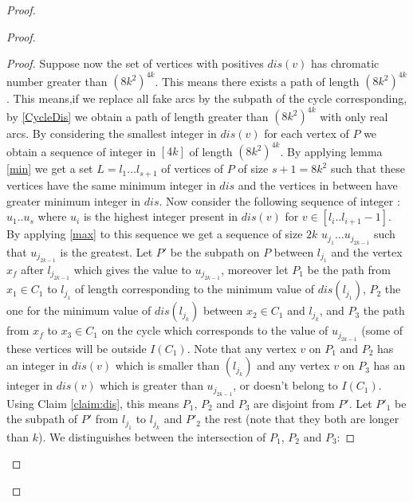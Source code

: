 \documentclass[utf8,10pt]{article}
\theoremstyle{plain}
\theoremstyle{definition}
\theoremstyle{remark}
\begin{document}
\begin{proof}
\begin{proof}
\begin{proof}





Suppose now the set of vertices with positives $dis(v)$ has chromatic number greater than $(8k^2)^{4k}$.
This means there exists a path of length $(8k^2)^{4k}$. This means,if we replace all fake arcs by the subpath of
the cycle corresponding, by \ref{CycleDis} we obtain a path of length greater than $(8k^2)^{4k}$ with only real arcs.
By considering the smallest integer in $dis(v)$ for each vertex of $P$ we obtain a sequence of integer in $[4k]$ of length $(8k^2)^{4k}$.
By applying lemma \ref{min} we get a set $L = l_1 \dots l_{s+1}$ of vertices of $P$ of size $s+1 = 8k^2$ such that these
vertices have the same minimum integer in $dis$ and the vertices in between have greater minimum integer in $dis$.
Now consider the following sequence of integer : $u_1 .. u_s$ where $u_i$ is the highest integer present in $dis(v)$
for $v \in [l_i .. l_{i+1} - 1]$.
By applying \ref{max} to this sequence we get a sequence of size $2k$ $u_{j_1} \dots u_{j_{2k-1}}$ such that $u_{j_{2k-1}}$ is the greatest.
Let $P'$ be the subpath on $P$ between $l_{j_1}$ and the vertex $x_f$ after $l_{j_{2k-1}}$ which gives the value to $u_{j_{2k-1}}$,
moreover let $P_1$  be the path from $x_1 \in C_1$ to $l_{j_1}$ of length corresponding to the minimum value of $dis(l_{j_1})$,
$P_2$ the one for the minimum value of $dis(l_{j_k})$ between $x_2 \in C_1$ and $l_{j_k}$, and $P_3$ the path
from $x_f$ to $x_3 \in C_1$ on the cycle which corresponds to the value of $u_{j_{2k-1}}$
(some of these vertices will be outside $I(C_1)$. Note that any vertex $v$ on $P_1$ and $P_2$ has an integer in $dis(v)$
which is smaller than $(l_{j_k})$ and any vertex $v$ on $P_3$ has an integer in $dis(v)$ which
is greater than $u_{j_{2k-1}}$, or doesn't belong to $I(C_1)$. Using Claim \ref{claim:dis}, this means
$P_1$, $P_2$ and $P_3$ are disjoint from $P'$. Let $P'_1$ be the subpath of $P'$ from $l_{j_1}$ to $l_{j_k}$ and  $P'_2$ the rest
(note that they both are longer than $k$).
We distinguishes between the intersection of $P_1$, $P_2$ and $P_3$:


\end{proof}
\end{proof}
\end{proof}
\end{document}
